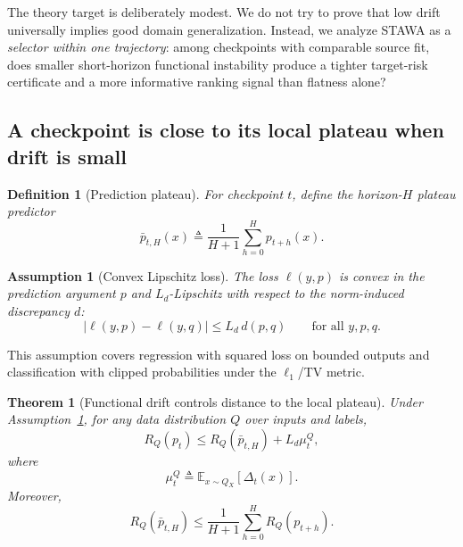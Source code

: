 \documentclass{article}
\newtheorem{theorem}{Theorem}
\newtheorem{definition}{Definition}
\newtheorem{assumption}{Assumption}
\newcommand{\EE}{\mathbb{E}}
\newcommand{\stawa}{\textup{\textsc{STAWA}}}
\begin{document}
The theory target is deliberately modest. We do not try to prove that low drift universally implies good domain generalization. Instead, we analyze \stawa{} as a \emph{selector within one trajectory}: among checkpoints with comparable source fit, does smaller short-horizon functional instability produce a tighter target-risk certificate and a more informative ranking signal than flatness alone?

\subsection{A checkpoint is close to its local plateau when drift is small}

\begin{definition}[Prediction plateau]
For checkpoint $t$, define the horizon-$H$ plateau predictor
\begin{equation}
    \bar p_{t,H}(x)
    \triangleq
    \frac{1}{H+1}\sum_{h=0}^{H} p_{t+h}(x).
    \label{eq:plateau}
\end{equation}
\end{definition}

\begin{assumption}[Convex Lipschitz loss]
\label{ass:lipschitz}
The loss $\ell(y,p)$ is convex in the prediction argument $p$ and $L_d$-Lipschitz with respect to the norm-induced discrepancy $d$:
\begin{equation}
    |\ell(y,p)-\ell(y,q)| \le L_d\, d(p,q)
    \qquad
    \text{for all } y,p,q.
\end{equation}
\end{assumption}

This assumption covers regression with squared loss on bounded outputs and classification with clipped probabilities under the $\ell_1$/TV metric.

\begin{theorem}[Functional drift controls distance to the local plateau]
\label{thm:plateau}
Under Assumption~\ref{ass:lipschitz}, for any data distribution $Q$ over inputs and labels,
\begin{equation}
    R_Q(p_t)
    \le
    R_Q(\bar p_{t,H}) + L_d \mu_t^Q,
    \label{eq:plateau_bound}
\end{equation}
where
\begin{equation}
    \mu_t^Q \triangleq \EE_{x\sim Q_X}\!\left[\Delta_t(x)\right].
\end{equation}
Moreover,
\begin{equation}
    R_Q(\bar p_{t,H})
    \le
    \frac{1}{H+1}\sum_{h=0}^{H} R_Q(p_{t+h}).
    \label{eq:plateau_jensen}
\end{equation}
\end{theorem}
\end{document}
